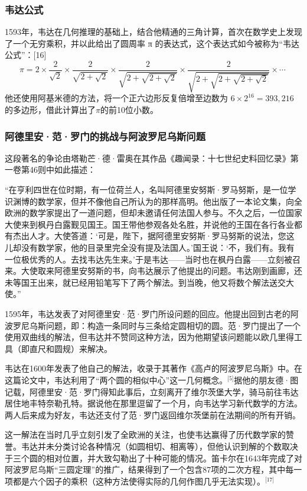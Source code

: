 \subsubsection{韦达公式}
1593年，韦达在几何推理的基础上，结合他精通的三角计算，首次在数学史上发现了一个无穷乘积，并以此给出了圆周率 π 的表达式，这个表达式如今被称为“韦达公式”：[16]
$$
\pi = 2 \times \frac{2}{\sqrt{2}} \times \frac{2}{\sqrt{2 + \sqrt{2}}} \times \frac{2}{\sqrt{2 + \sqrt{2 + \sqrt{2}}}} \times \frac{2}{\sqrt{2 + \sqrt{2 + \sqrt{2 + \sqrt{2}}}}} \times \cdots~
$$
他还使用阿基米德的方法，将一个正六边形反复倍增至边数为 $6 \times 2^{16} = 393,216$ 的多边形，借此计算出了$\pi$的前10位小数。
\subsubsection{阿德里安·范·罗门的挑战与阿波罗尼乌斯问题}
这段著名的争论由塔勒芒·德·雷奥在其作品《趣闻录：十七世纪史料回忆录》第一卷第46则中如此描述：

“在亨利四世在位时期，有一位荷兰人，名叫阿德里安努斯·罗马努斯，是一位学识渊博的数学家，但并不像他自己所认为的那样高明。他出版了一本论文集，向全欧洲的数学家提出了一道问题，但却未邀请任何法国人参与。不久之后，一位国家大使来到枫丹白露觐见国王。国王带他参观各处名胜，并说他的王国在各行各业都有杰出人才。大使答道：‘可是，陛下，据阿德里安努斯·罗马努斯的说法，您这儿却没有数学家，他的目录里完全没有提及法国人。’国王说：‘不，我们有。我有一位极优秀的人。去找韦达先生来。’于是韦达——当时也在枫丹白露——立刻被召来。大使取来阿德里安努斯的书，向韦达展示了他提出的问题。韦达刚到画廊，还未等国王出来，就已经用铅笔写下了两个解法。到当晚，他又将数个解法送交大使。”

1595年，韦达发表了对阿德里安·范·罗门所设问题的回应。他提出回到古老的阿波罗尼乌斯问题，即：构造一条同时与三条给定圆相切的圆。范·罗门提出了一个使用双曲线的解法，但韦达并不赞同这种方法，因为他期望该问题能以欧几里得工具（即直尺和圆规）来解决。

韦达在1600年发表了他自己的解法，收录于其著作《高卢的阿波罗尼乌斯》中。在这篇论文中，韦达利用了“两个圆的相似中心”这一几何概念。\(^\text{[5]}\)据他的朋友德·图记载，阿德里安·范·罗门得知此事后，立刻离开了维尔茨堡大学，骑马前往韦达居住地丰特奈勒孔特。据说他在那里逗留了一个月，向韦达学习新代数学的方法。两人后来成为好友，韦达还支付了范·罗门返回维尔茨堡前在法期间的所有开销。

这一解法在当时几乎立刻引发了全欧洲的关注，也使韦达赢得了历代数学家的赞誉。韦达并未分类讨论各种情况（如圆相切、相离等），但他认识到解的个数取决于三个圆的相对位置，并大致勾勒出了十种可能的情况。笛卡尔在1643年完成了对阿波罗尼乌斯“三圆定理”的推广，结果得到了一个包含87项的二次方程，其中每一项都是六个因子的乘积（这种方法使得实际的几何作图几乎无法实现）。\(^\text{[17]}\)
